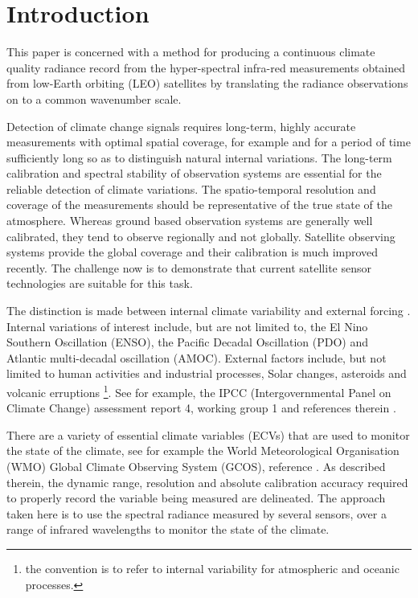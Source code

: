 \documentclass[11pt]{article}
\begin{document}
\section{Introduction}
\label{sec:orgheadline2}

This paper is concerned with a method for producing a continuous climate quality radiance record from the hyper-spectral infra-red measurements obtained from low-Earth orbiting (LEO) satellites by translating the radiance observations on to a common wavenumber scale.

Detection of climate change signals requires long-term, highly accurate measurements with optimal spatial coverage, for example \cite{wielicki2013} and for a period of time sufficiently long so as to distinguish natural internal variations. The long-term calibration and spectral stability of observation systems are essential for the reliable detection of climate variations. The spatio-temporal resolution and coverage of the measurements should be representative of the true state of the atmosphere. Whereas ground based observation systems are generally well calibrated, they tend to observe regionally and not globally. Satellite observing systems provide the global coverage and their calibration is much improved recently. The challenge now is to demonstrate that current satellite sensor technologies are suitable for this task.

The distinction is made between internal climate variability and external forcing \cite{solomon2010}. Internal variations of interest include, but are not limited to, the El Nino Southern Oscillation (ENSO), the Pacific Decadal Oscillation (PDO) and Atlantic multi-decadal oscillation (AMOC). External factors include, but not limited to human activities and industrial processes, Solar changes, asteroids and volcanic erruptions \footnote{the convention is to refer to internal variability for atmospheric and oceanic processes. }. See for example, the IPCC (Intergovernmental Panel on Climate Change) assessment report 4, working group 1 and references therein \cite{ipcc2007_wg1}. 

There are a variety of essential climate variables (ECVs) that are used to monitor the state of the climate, see for example the World Meteorological Organisation (WMO) Global Climate Observing System (GCOS), reference \cite{gcos}. As described therein, the dynamic range, resolution and absolute calibration accuracy required to properly record the variable being measured are delineated. The approach taken here is to use the spectral radiance measured by several sensors, over a range of infrared wavelengths to monitor the state of the climate.
\end{document}
